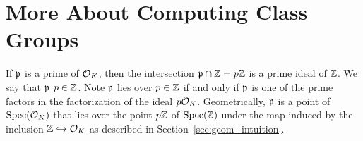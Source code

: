 


\section{More About Computing Class Groups}\label{sec:comcg}

If $\mathfrak{p}$ is a prime of $\mathcal{O}_K$, then the intersection $\mathfrak{p}\cap \mathbb{Z}=p\mathbb{Z}$ is
a prime ideal of $\mathbb{Z}$.  We say that $\mathfrak{p}$  $p\in\mathbb{Z}$.
Note $\mathfrak{p}$ lies over $p\in\mathbb{Z}$ if and only if $\mathfrak{p}$ is one of the prime
factors in the factorization of the ideal $p\mathcal{O}_K$.  Geometrically,
$\mathfrak{p}$ is a point of $\operatorname{Spec}(\mathcal{O}_K)$ that lies over the point $p\mathbb{Z}$ of
$\operatorname{Spec}(\mathbb{Z})$ under the map induced by the inclusion $\mathbb{Z}\hookrightarrow \mathcal{O}_K$
as described in Section~\ref{sec:geom_intuition}.



